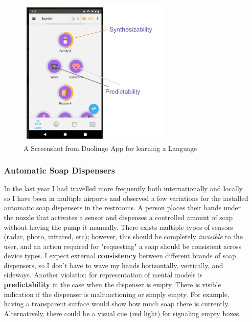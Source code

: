 \documentclass[12pt,letterpaper]{article}
\begin{document}
\begin{figure}[h]
\centering
\includegraphics[width=3in,scale=.6]{figures/p3/duolingvo.png}
\caption{A Screenshot from Duolingo App for learning a Language}
\label{fig::3}
\end{figure}

\subsubsection*{Automatic Soap Dispensers}
In the last year I had travelled more frequently both internationally and locally so I have been in multiple airports and observed a few variations for the installed automatic soap dispensers in the restrooms. A person places their hands under the nozzle that activates a sensor and dispenses a controlled amount of soap without having the pump it manually. There exists multiple types of sensors (radar, photo, infrared, etc); however, this should be completely  \textit{invisible} to the user, and an action required for "requesting" a soap should be consistent across device types. I expect external \textbf{consistency} between different brands of soap dispensers, so I don't have to wave my hands horizontally, vertically, and sideways. Another violation for representation of mental models is \textbf{predictability} in the case when the dispenser is empty. There is visible indication if the dispenser is malfunctioning or simply empty. For example, having a transparent surface would show how much soap there is currently. Alternatively, there could be a visual cue (red light) for signaling empty boxes.

 

\end{document}
